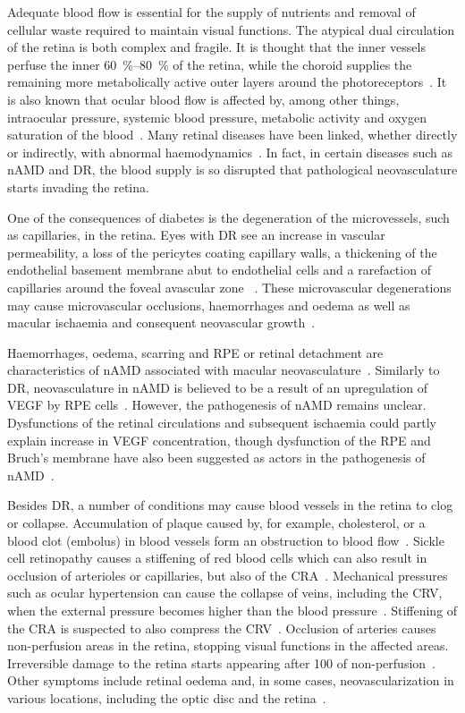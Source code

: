 \documentclass{article}
\begin{document}
Adequate blood flow is essential for the supply of nutrients and removal of cellular waste required to maintain visual functions.
The atypical dual circulation of the retina is both complex and fragile.
It is thought that the inner vessels perfuse the inner \SIrange{60}{80}{\percent} of the retina, while the choroid supplies the remaining more metabolically active outer layers around the photoreceptors~\cite{Birol_2007}.
It is also known that ocular blood flow is affected by, among other things, intraocular pressure, systemic blood pressure, metabolic activity and oxygen saturation of the blood~\cite{Birol_2007,McCullough_1997,Palkovits_2014,Polska_2007,Pournaras_2008,Riva_1997,Wang_2014}.
Many retinal diseases have been linked, whether directly or indirectly, with abnormal haemodynamics~\cite{Hayreh_2004,Medina_2016}.
In fact, in certain diseases such as nAMD and DR, the blood supply is so disrupted that pathological neovasculature starts invading the retina.

One of the consequences of diabetes is the degeneration of the microvessels, such as capillaries, in the retina.
Eyes with DR see an increase in vascular permeability, a loss of the pericytes coating capillary walls, a thickening of the endothelial basement membrane abut to endothelial cells and a rarefaction of capillaries around the foveal avascular zone ~\cite{Medina_2016}.
These microvascular degenerations may cause microvascular occlusions, haemorrhages and oedema as well as macular ischaemia and consequent neovascular growth~\cite{Medina_2016}.

Haemorrhages, oedema, scarring and RPE or retinal detachment are characteristics of nAMD associated with macular neovasculature~\cite{Gupta_2015,Jager_2008}.
Similarly to DR, neovasculature in nAMD is believed to be a result of an upregulation of VEGF by RPE cells~\cite{Jager_2008}.
However, the pathogenesis of nAMD remains unclear.
Dysfunctions of the retinal circulations and subsequent ischaemia could partly explain increase in VEGF concentration, though dysfunction of the RPE and Bruch's membrane have also been suggested as actors in the pathogenesis of nAMD~\cite{Ambati_and_Fowler_2012,Pemp_2008,Liu_1995}.

Besides DR, a number of conditions may cause blood vessels in the retina to clog or collapse.
Accumulation of plaque caused by, for example, cholesterol, or a blood clot (embolus) in blood vessels form an obstruction to blood flow~\cite{Medina_2016}.
Sickle cell retinopathy causes a stiffening of red blood cells which can also result in occlusion of arterioles or capillaries, but also of the CRA~\cite{Medina_2016}.
Mechanical pressures such as ocular hypertension can cause the collapse of veins, including the CRV, when the external pressure becomes higher than the blood pressure~\cite{Hayreh_2004}.
Stiffening of the CRA is suspected to also compress the CRV~\cite{Medina_2016}.
Occlusion of arteries causes non-perfusion areas in the retina, stopping visual functions in the affected areas.
Irreversible damage to the retina starts appearing after \SI{100}{\min} of non-perfusion~\cite{Hayreh_2004}.
Other symptoms include retinal oedema and, in some cases, neovascularization in various locations, including the optic disc and the retina~\cite{Medina_2016}.
\end{document}
